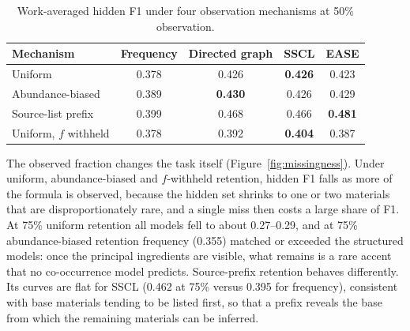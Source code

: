 \documentclass[10pt,a4paper]{article}
\begin{document}
\begin{table}[H]
\caption{Work-averaged hidden F1 under four observation mechanisms at 50\% observation.}
\label{tab:missing}
\small
\begin{tabularx}{\textwidth}{lCCCC}
\toprule
\textbf{Mechanism} & \textbf{Frequency} & \textbf{Directed graph} & \textbf{SSCL} & \textbf{EASE} \\
\midrule
Uniform & 0.378 & 0.426 & \textbf{0.426} & 0.423 \\
Abundance-biased & 0.389 & \textbf{0.430} & 0.426 & 0.429 \\
Source-list prefix & 0.399 & 0.468 & 0.466 & \textbf{0.481} \\
Uniform, $f$ withheld & 0.378 & 0.392 & \textbf{0.404} & 0.387 \\
\bottomrule
\end{tabularx}
\end{table}

The observed fraction changes the task itself (Figure~\ref{fig:missingness}). Under uniform, abundance-biased and $f$-withheld retention, hidden F1 falls as more of the formula is observed, because the hidden set shrinks to one or two materials that are disproportionately rare, and a single miss then costs a large share of F1. At 75\% uniform retention all models fell to about 0.27--0.29, and at 75\% abundance-biased retention frequency (0.355) matched or exceeded the structured models: once the principal ingredients are visible, what remains is a rare accent that no co-occurrence model predicts. Source-prefix retention behaves differently. Its curves are flat for SSCL (0.462 at 75\% versus 0.395 for frequency), consistent with base materials tending to be listed first, so that a prefix reveals the base from which the remaining materials can be inferred.
\end{document}

